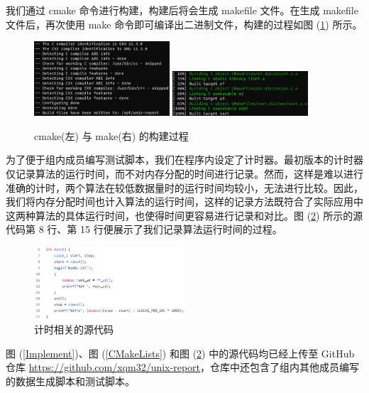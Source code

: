 我们通过 cmake 命令进行构建，构建后将会生成 makefile 文件。在生成 makefile 文件后，再次使用 make 命令即可编译出二进制文件，构建的过程如图 (\ref{Build}) 所示。

\begin{figure}[htb]
    \centering
    \includegraphics[width=0.45\textwidth]{figures/c@cmake.png}
    \qquad
    \includegraphics[width=0.45\textwidth]{figures/c@make.png}
    \caption{cmake(左) 与 make(右) 的构建过程}
    \label{Build}
\end{figure}

为了便于组内成员编写测试脚本，我们在程序内设定了计时器。最初版本的计时器仅记录算法的运行时间，而不对内存分配的时间进行记录。然而，这样是难以进行准确的计时，两个算法在较低数据量时的运行时间均较小，无法进行比较。因此，我们将内存分配时间也计入算法的运行时间，这样的记录方法既符合了实际应用中这两种算法的具体运行时间，也使得时间更容易进行记录和对比。图 (\ref{Clock}) 所示的源代码第 8 行、第 15 行便展示了我们记录算法运行时间的过程。

\begin{figure}[htb]
    \centering
    \includegraphics[width=0.5\textwidth]{figures/c@clock}
    \caption{计时相关的源代码}
    \label{Clock}
\end{figure}

图 (\ref{Implement})、图 (\ref{CMakeLists}) 和图 (\ref{Clock}) 中的源代码均已经上传至 GitHub 仓库 \href{https://github.com/xqm32/unix-report}{https://github.com/xqm32/unix-report}，仓库中还包含了组内其他成员编写的数据生成脚本和测试脚本。